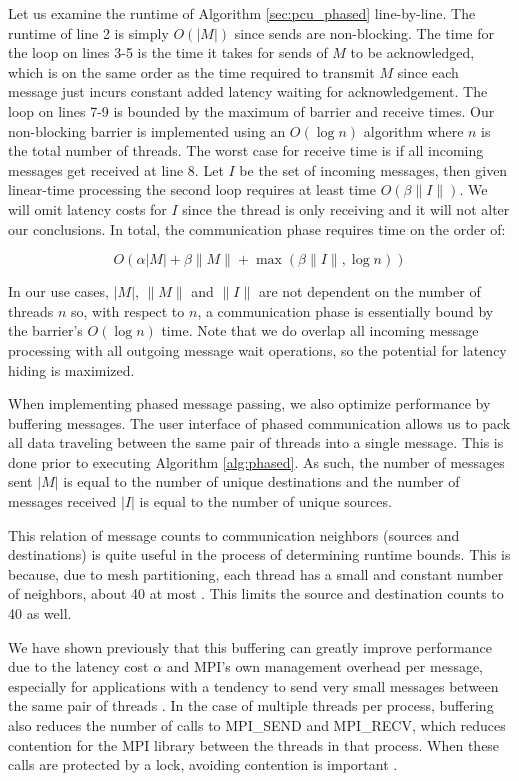 Let us examine the runtime of Algorithm \ref{sec:pcu_phased} line-by-line.
The runtime of line 2 is simply $O(|M|)$ since sends are non-blocking.
The time for the loop on lines 3-5 is the time it takes
for sends of $M$ to be acknowledged, which is on the same order
as the time required to transmit $M$ since each message just incurs
constant added latency waiting for acknowledgement.
The loop on lines 7-9 is bounded by the maximum of barrier and receive times.
Our non-blocking barrier is implemented using an $O(\log n)$ algorithm where
$n$ is the total number of threads.
The worst case for receive time is if all incoming messages get received at
line 8.
Let $I$ be the set of incoming messages, then given linear-time processing
the second loop requires at least time $O(\beta\|I\|)$.
We will omit latency costs for $I$ since the thread is only receiving
and it will not alter our conclusions.
In total, the communication phase requires time on the order of:

\[O(\alpha|M| + \beta\|M\| + \max(\beta\|I\|,\log n))\]

In our use cases, $|M|$, $\|M\|$ and $\|I\|$ are
not dependent on the number of threads $n$ so, with respect to $n$,
a communication phase is essentially bound by the barrier's $O(\log n)$ time.
Note that we do overlap all incoming message processing with all outgoing
message wait operations, so the potential for latency hiding is maximized.

When implementing phased message passing, we also optimize performance
by buffering messages.
The user interface of phased communication allows us to pack
all data traveling between the same pair of threads into a single message.
This is done prior to executing Algorithm \ref{alg:phased}.
As such, the number of messages sent $|M|$ is equal to the number of unique
destinations and the number of messages received $|I|$ is equal to the number
of unique sources.

This relation of message counts to communication neighbors (sources and
destinations) is quite useful in the process of determining runtime bounds.
This is because, due to mesh partitioning, each thread has a small
and constant number of neighbors,
about 40 at most \cite{zhou2010petascale}.
This limits the source and destination counts to 40 as well.

We have shown previously that this buffering can greatly improve performance
due to the latency cost $\alpha$ and MPI's own management overhead per message,
especially for applications
with a tendency to send very small messages between the same pair of threads
\cite{ovcharenko2012neighborhood}.
In the case of multiple threads per process, buffering also reduces
the number of calls to MPI\_SEND and MPI\_RECV, which reduces
contention for the MPI library between the threads in that process.
When these calls are protected by a lock, avoiding contention is important
\cite{mavriplis2002parallel}.

